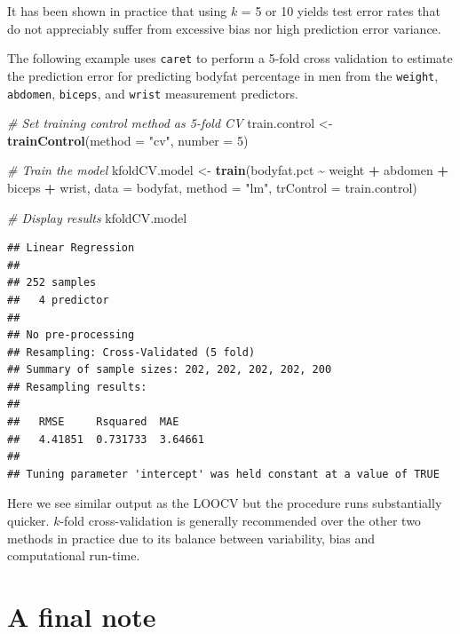 \documentclass[
]{book}
\newenvironment{Shaded}{\begin{snugshade}}{\end{snugshade}}
\newcommand{\AttributeTok}[1]{\textcolor[rgb]{0.13,0.29,0.53}{#1}}
\newcommand{\CommentTok}[1]{\textcolor[rgb]{0.56,0.35,0.01}{\textit{#1}}}
\newcommand{\DecValTok}[1]{\textcolor[rgb]{0.00,0.00,0.81}{#1}}
\newcommand{\FunctionTok}[1]{\textcolor[rgb]{0.13,0.29,0.53}{\textbf{#1}}}
\newcommand{\NormalTok}[1]{#1}
\newcommand{\OtherTok}[1]{\textcolor[rgb]{0.56,0.35,0.01}{#1}}
\newcommand{\SpecialCharTok}[1]{\textcolor[rgb]{0.81,0.36,0.00}{\textbf{#1}}}
\newcommand{\StringTok}[1]{\textcolor[rgb]{0.31,0.60,0.02}{#1}}
\begin{document}
It has been shown in practice that using \(k\) = 5 or 10 yields test error rates that do not appreciably suffer from excessive bias nor high prediction error variance.

The following example uses \texttt{caret} to perform a 5-fold cross validation to estimate the prediction error for predicting bodyfat percentage in men from the \texttt{weight}, \texttt{abdomen}, \texttt{biceps}, and \texttt{wrist} measurement predictors.

\begin{Shaded}
\begin{Highlighting}[]
\CommentTok{\# Set training control method as 5{-}fold CV}
\NormalTok{train.control }\OtherTok{\textless{}{-}} \FunctionTok{trainControl}\NormalTok{(}\AttributeTok{method =} \StringTok{"cv"}\NormalTok{, }\AttributeTok{number =} \DecValTok{5}\NormalTok{)}

\CommentTok{\# Train the model}
\NormalTok{kfoldCV.model }\OtherTok{\textless{}{-}} \FunctionTok{train}\NormalTok{(bodyfat.pct }\SpecialCharTok{\textasciitilde{}}\NormalTok{ weight }\SpecialCharTok{+}\NormalTok{ abdomen }\SpecialCharTok{+}\NormalTok{ biceps }\SpecialCharTok{+}\NormalTok{ wrist, }
                       \AttributeTok{data =}\NormalTok{ bodyfat, }
                       \AttributeTok{method =} \StringTok{"lm"}\NormalTok{,}
                       \AttributeTok{trControl =}\NormalTok{ train.control)}

\CommentTok{\# Display results}
\NormalTok{kfoldCV.model}
\end{Highlighting}
\end{Shaded}

\begin{verbatim}
## Linear Regression 
## 
## 252 samples
##   4 predictor
## 
## No pre-processing
## Resampling: Cross-Validated (5 fold) 
## Summary of sample sizes: 202, 202, 202, 202, 200 
## Resampling results:
## 
##   RMSE     Rsquared  MAE    
##   4.41851  0.731733  3.64661
## 
## Tuning parameter 'intercept' was held constant at a value of TRUE
\end{verbatim}

Here we see similar output as the LOOCV but the procedure runs substantially quicker. \(k\)-fold cross-validation is generally recommended over the other two methods in practice due to its balance between variability, bias and computational run-time.

\hypertarget{a-final-note}{%
\section{A final note}\label{a-final-note}}
\end{document}
